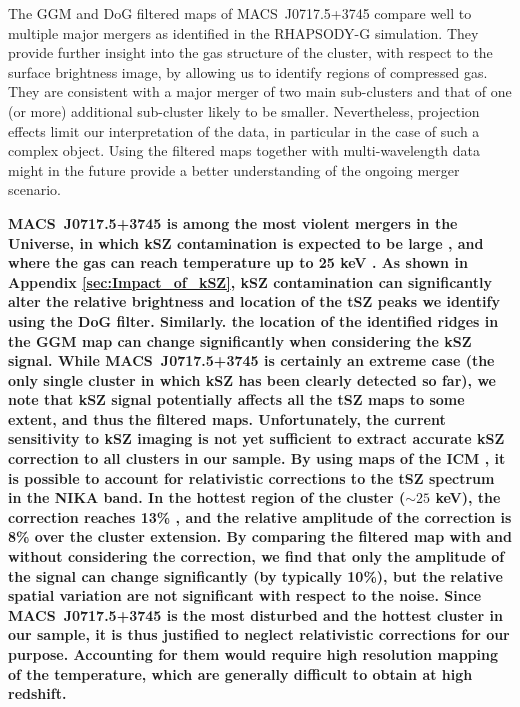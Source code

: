 \documentclass[twocolumn,traditabstract]{aa}
\begin{document}
The GGM and DoG filtered maps of \mbox{MACS~J0717.5+3745} compare well to multiple major mergers as identified in the RHAPSODY-G simulation. They provide further insight into the gas structure of the cluster, with respect to the surface brightness image, by allowing us to identify regions of compressed gas. They are consistent with a major merger of two main sub-clusters and that of one (or more) additional sub-cluster likely to be smaller. Nevertheless, projection effects limit our interpretation of the data, in particular in the case of such a complex object. Using the filtered maps together with multi-wavelength data might in the future provide a better understanding of the ongoing merger scenario.

{\bf \mbox{MACS~J0717.5+3745} is among the most violent mergers in the Universe, in which kSZ contamination is expected to be large \citep{Mroczkowski2012,Sayers2013,Adam2016b}, and where the gas can reach temperature up to 25 keV \citep[e.g.][]{Adam2017}. As shown in Appendix \ref{sec:Impact_of_kSZ}, kSZ contamination can significantly alter the relative brightness and location of the tSZ peaks we identify using the DoG filter. Similarly. the location of the identified ridges in the GGM map can change significantly when considering the kSZ signal. While \mbox{MACS~J0717.5+3745} is certainly an extreme case (the only single cluster in which kSZ has been clearly detected so far), we note that kSZ signal potentially affects all the tSZ maps to some extent, and thus the filtered maps. Unfortunately, the current sensitivity to kSZ imaging is not yet sufficient to extract accurate kSZ correction to all clusters in our sample. By using maps of the ICM \citep[e.g.][]{Adam2017}, it is possible to account for relativistic corrections to the tSZ spectrum in the NIKA band. In the hottest region of the cluster ($\sim 25$ keV), the correction reaches 13\% \citep[see also Table 1 in][]{Adam2016b}, and the relative amplitude of the correction is 8\% over the cluster extension. By comparing the filtered map with and without considering the correction, we find that only the amplitude of the signal can change significantly (by typically 10\%), but the relative spatial variation are not significant with respect to the noise. Since \mbox{MACS~J0717.5+3745} is the most disturbed and the hottest cluster in our sample, it is thus justified to neglect relativistic corrections for our purpose. Accounting for them would require high resolution mapping of the temperature, which are generally difficult to obtain at high redshift.}
\end{document}
